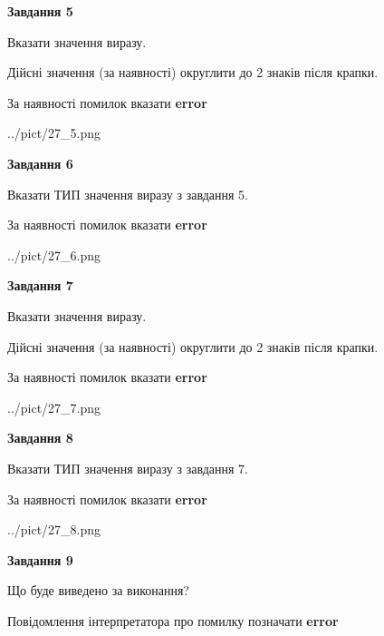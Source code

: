 \documentclass[11pt, ukrainian]{article}
\begin{document}
{\begin {large}
{\begin {center}\textbf{Завдання 5}\end {center}}\par
Вказати значення виразу. \par
Дійсні значення (за наявності) округлити до 2 знаків після крапки. \par
За наявності помилок вказати \textbf{error}

\begin{center}
	{../pict/27_5.png}
\end{center}
\newpage

{\begin {center}\textbf{Завдання 6}\end {center}}\par
Вказати ТИП значення виразу з завдання 5. \par
За наявності помилок вказати \textbf{error}

\begin{center}
	{../pict/27_6.png}
\end{center}
\newpage

{\begin {center}\textbf{Завдання 7}\end {center}}\par
Вказати значення виразу. \par
Дійсні значення (за наявності) округлити до 2 знаків після крапки. \par
За наявності помилок вказати \textbf{error}

\begin{center}
	{../pict/27_7.png}
\end{center}
\newpage

{\begin {center}\textbf{Завдання 8}\end {center}}\par
Вказати ТИП значення виразу з завдання 7. \par
За наявності помилок вказати \textbf{error}

\begin{center}
	{../pict/27_8.png}
\end{center}
\newpage

{\begin {center}\textbf{Завдання 9}\end {center}}\par
Що буде виведено за виконання? \par
Повідомлення інтерпретатора про помилку позначати \textbf{error}


\end{large}}
\end{document}
